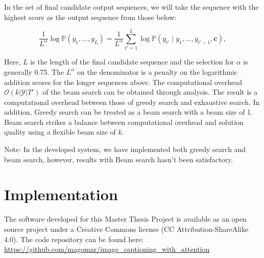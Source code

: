 In the set of final candidate output sequences, we will take the sequence with the highest score as the output sequence from those below:

$$ \frac{1}{L^\alpha} \log \mathbb{P}(y_1, \ldots, y_{L}) = \frac{1}{L^\alpha} \sum_{t'=1}^L \log \mathbb{P}(y_{t'} \mid y_1, \ldots, y_{t'-1}, \boldsymbol{c}),$$

Here, $L$ is the length of the final candidate sequence and the selection for $\alpha$ is generally 0.75. The $L^\alpha$ on the denominator is a penalty on the logarithmic addition scores for the longer sequences above. The computational overhead $\mathcal{O}(k\left|\mathcal{Y}\right|T')$ of the beam search can be obtained through analysis. The result is a computational overhead between those of greedy search and exhaustive search. In addition, Greedy search can be treated as a beam search with a beam size of 1. Beam search strikes a balance between computational overhead and solution quality using a flexible beam size of $k$.

Note: In the developed system, we have implemented both greedy search and beam search, however, results with Beam search hasn't been satisfactory. 


\section{Implementation}

The software developed for this Master Thesis Project is available as an open source project under a Creative Commons license (CC Attribution-ShareAlike 4.0).
The code repository can be found here:  \href{https://gitlab.com/uoc-data_science/image_captioning_with_attention}{\url{https://github.com/magomar/image_captioning_with_attention}}

